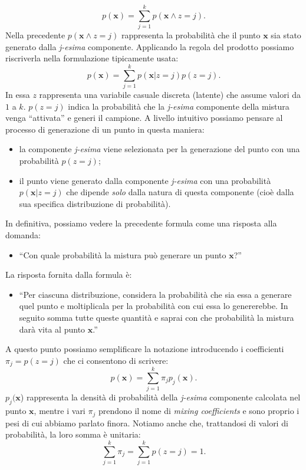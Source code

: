 \begin{equation*}
p(\mathbf{x}) = \sum_{j=1}^k p(\mathbf{x} \land z = j).
\end{equation*}
Nella precedente $p(\mathbf{x} \land z = j)$ rappresenta la probabilità che il punto $\mathbf{x}$ sia stato generato dalla \emph{j-esima} componente. Applicando la regola del prodotto possiamo riscriverla nella formulazione tipicamente usata:
\begin{equation*}
p(\mathbf{x}) = \sum_{j=1}^k p(\mathbf{x}| z = j) p(z = j).
\end{equation*}
In essa $z$ rappresenta una variabile casuale discreta (latente) che assume valori da $1$ a $k$. $p(z=j)$ indica la probabilità che la \emph{j-esima} componente della mistura venga ``attivata'' e generi il campione.
A livello intuitivo possiamo pensare al processo di generazione di un punto in questa maniera:
\begin{itemize}
\item la componente \emph{j-esima} viene selezionata per la generazione del punto con una probabilità $p(z=j)$;
\item il punto viene generato dalla componente \emph{j-esima} con una probabilità $p(\mathbf{x}|z=j)$ che dipende \emph{solo} dalla natura di questa componente (cioè dalla sua specifica distribuzione di probabilità).
\end{itemize}
In definitiva, possiamo vedere la precedente formula come una risposta alla domanda:
\begin{itemize}
\item ``Con quale probabilità la mistura può generare un punto $\mathbf{x}$?''
\end{itemize}
La risposta fornita dalla formula è:
\begin{itemize}
\item ``Per ciascuna distribuzione, considera la probabilità che sia essa a generare quel punto e moltiplicala per la probabilità con cui essa lo genererebbe. In seguito somma tutte queste quantità e saprai con che probabilità la mistura darà vita al punto $\mathbf{x}$.''
\end{itemize}

A questo punto possiamo semplificare la notazione introducendo i coefficienti $\pi_j = p(z=j)$ che ci consentono di scrivere: 
\begin{equation*}
p(\mathbf{x}) = \sum_{j=1}^k \pi_j p_j(\mathbf{x}).
\end{equation*}
$p_j(\mathbf{x}$) rappresenta la densità di probabilità della \emph{j-esima} componente calcolata nel punto $\mathbf{x}$, mentre i vari $\pi_j$ prendono il nome di \emph{mixing coefficients} e sono proprio i pesi di cui abbiamo parlato finora. Notiamo anche che, trattandosi di valori di probabilità, la loro somma è unitaria:
\begin{equation*}
\sum_{j=1}^k\pi_j= \sum_{j=1}^k p(z=j) = 1.
\end{equation*}

